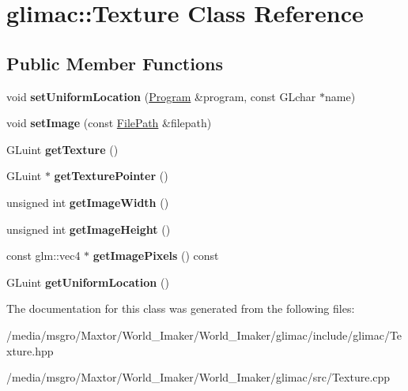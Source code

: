 \hypertarget{classglimac_1_1Texture}{}\section{glimac\+:\+:Texture Class Reference}
\label{classglimac_1_1Texture}
\subsection*{Public Member Functions}
\begin{DoxyCompactItemize}
\item 
\mbox{\label{classglimac_1_1Texture_a2a1e06217a8c98f4ddd7c271b7590c03}} 
void {\bfseries set\+Uniform\+Location} (\hyperlink{classglimac_1_1Program}{Program} \&program, const G\+Lchar $\ast$name)
\item 
\mbox{\label{classglimac_1_1Texture_a412726a887d5b80d6382e0d25584661f}} 
void {\bfseries set\+Image} (const \hyperlink{classglimac_1_1FilePath}{File\+Path} \&filepath)
\item 
\mbox{\label{classglimac_1_1Texture_aab4d5370b02499884260a3ce9e7349be}} 
G\+Luint {\bfseries get\+Texture} ()
\item 
\mbox{\label{classglimac_1_1Texture_ac222b4e2c040a8b64484bb60eb73574f}} 
G\+Luint $\ast$ {\bfseries get\+Texture\+Pointer} ()
\item 
\mbox{\label{classglimac_1_1Texture_af27c9e6a54fe8a60cedaad97d8acbcae}} 
unsigned int {\bfseries get\+Image\+Width} ()
\item 
\mbox{\label{classglimac_1_1Texture_a66760a2dc586c0780ee3b9961048424b}} 
unsigned int {\bfseries get\+Image\+Height} ()
\item 
\mbox{\label{classglimac_1_1Texture_a7060818013d2bfbe42df5d0b01f2825d}} 
const glm\+::vec4 $\ast$ {\bfseries get\+Image\+Pixels} () const
\item 
\mbox{\label{classglimac_1_1Texture_a80d018b2208095d54c3439e6328761ff}} 
G\+Luint {\bfseries get\+Uniform\+Location} ()
\end{DoxyCompactItemize}


The documentation for this class was generated from the following files\+:\begin{DoxyCompactItemize}
\item 
/media/msgro/\+Maxtor/\+World\+\_\+\+Imaker/\+World\+\_\+\+Imaker/glimac/include/glimac/Texture.\+hpp\item 
/media/msgro/\+Maxtor/\+World\+\_\+\+Imaker/\+World\+\_\+\+Imaker/glimac/src/Texture.\+cpp\end{DoxyCompactItemize}
